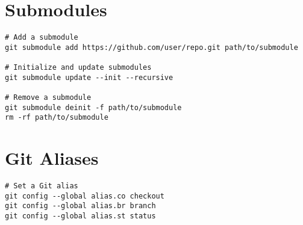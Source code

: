 \documentclass[11pt]{article}
\begin{document}
    \section*{Submodules}
    \begin{lstlisting}[style=gitStyle]
# Add a submodule
git submodule add https://github.com/user/repo.git path/to/submodule

# Initialize and update submodules
git submodule update --init --recursive

# Remove a submodule
git submodule deinit -f path/to/submodule
rm -rf path/to/submodule
    \end{lstlisting}

    \section*{Git Aliases}
    \begin{lstlisting}[style=gitStyle]
# Set a Git alias
git config --global alias.co checkout
git config --global alias.br branch
git config --global alias.st status
    \end{lstlisting}
\end{document}
